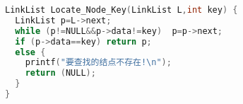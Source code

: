 \begin{lstlisting}[language=C]
LinkList Locate_Node_Key(LinkList L,int key) {
  LinkList p=L->next;  
  while (p!=NULL&&p->data!=key)  p=p->next;  
  if (p->data==key) return p;
  else {
    printf("要查找的结点不存在!\n");
    return (NULL);
  }
}
\end{lstlisting}
